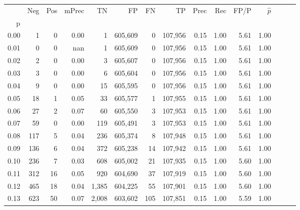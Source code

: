 \begin{tabular}{rrrrrrrrrrrrrrr}
\toprule
{} &      Neg &     Pos & mPrec &       TN &       FP &       FN &       TP &  Prec &   Rec &  FP/P & $\hat{p}$ \\
p    &          &         &       &          &          &          &          &       &       &       &           \\
\midrule
0.00 &        1 &       0 &  0.00 &        1 &  605,609 &        0 &  107,956 &  0.15 &  1.00 &  5.61 &      1.00 \\
0.01 &        0 &       0 &   nan &        1 &  605,609 &        0 &  107,956 &  0.15 &  1.00 &  5.61 &      1.00 \\
0.02 &        2 &       0 &  0.00 &        3 &  605,607 &        0 &  107,956 &  0.15 &  1.00 &  5.61 &      1.00 \\
0.03 &        3 &       0 &  0.00 &        6 &  605,604 &        0 &  107,956 &  0.15 &  1.00 &  5.61 &      1.00 \\
0.04 &        9 &       0 &  0.00 &       15 &  605,595 &        0 &  107,956 &  0.15 &  1.00 &  5.61 &      1.00 \\
0.05 &       18 &       1 &  0.05 &       33 &  605,577 &        1 &  107,955 &  0.15 &  1.00 &  5.61 &      1.00 \\
0.06 &       27 &       2 &  0.07 &       60 &  605,550 &        3 &  107,953 &  0.15 &  1.00 &  5.61 &      1.00 \\
0.07 &       59 &       0 &  0.00 &      119 &  605,491 &        3 &  107,953 &  0.15 &  1.00 &  5.61 &      1.00 \\
0.08 &      117 &       5 &  0.04 &      236 &  605,374 &        8 &  107,948 &  0.15 &  1.00 &  5.61 &      1.00 \\
0.09 &      136 &       6 &  0.04 &      372 &  605,238 &       14 &  107,942 &  0.15 &  1.00 &  5.61 &      1.00 \\
0.10 &      236 &       7 &  0.03 &      608 &  605,002 &       21 &  107,935 &  0.15 &  1.00 &  5.60 &      1.00 \\
0.11 &      312 &      16 &  0.05 &      920 &  604,690 &       37 &  107,919 &  0.15 &  1.00 &  5.60 &      1.00 \\
0.12 &      465 &      18 &  0.04 &    1,385 &  604,225 &       55 &  107,901 &  0.15 &  1.00 &  5.60 &      1.00 \\
0.13 &      623 &      50 &  0.07 &    2,008 &  603,602 &      105 &  107,851 &  0.15 &  1.00 &  5.59 &      1.00 \\

\end{tabular}
